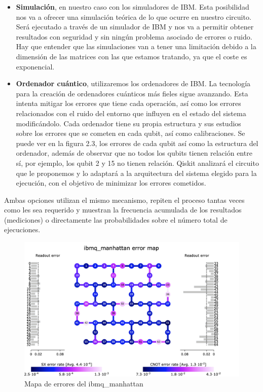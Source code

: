  \begin{itemize}
     \item \textbf{Simulación}, en nuestro caso con los simuladores de IBM. Esta posibilidad nos va a ofrecer una simulación teórica de lo que ocurre en nuestro circuito. Será ejecutado a través de un simulador de IBM y nos va a permitir obtener resultados con seguridad y sin ningún problema asociado de errores o ruido. Hay que entender que las simulaciones van a tener una limitación debido a la dimensión de las matrices con las que estamos tratando, ya que el coste es exponencial.
     
     \item \textbf{Ordenador cuántico}, utilizaremos los ordenadores de IBM. La tecnología para la creación de ordenadores cuánticos más fieles sigue avanzando. Esta intenta mitigar los errores que tiene cada operación, así como los errores relacionados con el ruido del entorno que influyen en el estado del sistema modificándolo. Cada ordenador tiene su propia estructura y sus estudios sobre los errores que se cometen en cada qubit, así como calibraciones. Se puede ver en la figura 2.3, los errores de cada qubit así como la estructura del ordenador, además de observar que no todos los qubits tienen relación entre sí, por ejemplo, los qubit 2 y 15 no tienen relación. Qiskit analizará el circuito que le proponemos y lo adaptará a la arquitectura del sistema elegido para la ejecución, con el objetivo de minimizar los errores cometidos.
     
 \end{itemize}



 Ambas opciones utilizan el mismo mecanismo, repiten el proceso tantas veces como les sea requerido y muestran la frecuencia acumulada de los resultados (mediciones) o directamente las probabilidades sobre el número total de ejecuciones. \newline

  \begin{figure}[H]
    \centering
    \includegraphics[width=\textwidth]{TFG/imagenes/system_error_manhattan.png}
    \caption{Mapa de errores del ibmq\_manhattan} 
    \label{FIG:MapaErrores}
 \end{figure}

